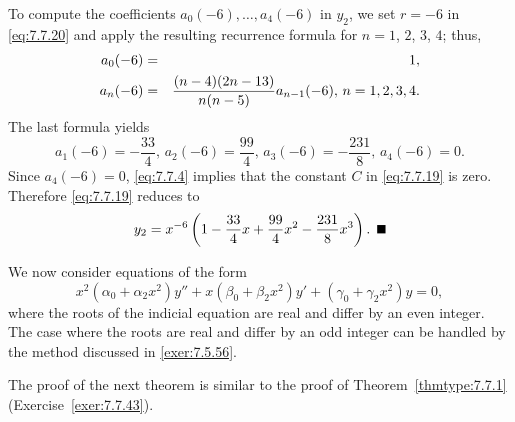 \begin{examplesolution}
To compute the coefficients $a_{0}(-6),\dots,a_{4}(-6)$ in $y_{2}$, we set $r=-6$ in
\eqref{eq:7.7.20} and apply the resulting recurrence formula for $n=1$, $2$, $3$, $4$; thus,
\begin{eqnarray*}
  a_{0}(-6) & = & 1, \\
  a_{n}(-6) & = & \displaystyle\frac{(n-4)(2n-13)}{n(n-5)}a_{n-1}(-6),\,n=1,2,3,4.
\end{eqnarray*}
The last formula yields
\[
  a_{1}(-6)=-\frac{33}{4},\,a_{2}(-6)=\frac{99}{4},\,a_{3}(-6)=-\frac{231}{8},\,a_{4}(-6)=0.
\]
Since $a_{4}(-6)=0$, \eqref{eq:7.7.4} implies that the constant $C$ in \eqref{eq:7.7.19} is zero.
Therefore \eqref{eq:7.7.19} reduces to
\[
  y_{2}=x^{-6}\left(1-\frac{33}{4}x+\frac{99}{4}x^{2}-\frac{231}{8}x^{3}\right).\bbox
\]
\end{examplesolution}

We now consider equations of the form
\[
  x^{2}(\alpha_{0}+\alpha_{2}x^{2})y''+x(\beta_{0}+\beta_{2}x^{2})y' +(\gamma_{0}+\gamma_{2}x^{2})y=0,
\]
where the roots of the indicial equation are real and differ by an even integer. The case where the
roots are real and differ by an odd integer can be handled by the method discussed in
\ref{exer:7.5.56}.

The proof of the next theorem is similar to the proof of Theorem~\ref{thmtype:7.7.1}
(Exercise~\ref{exer:7.7.43}).

